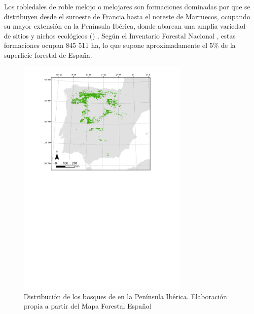 Los robledales de roble melojo o melojares son formaciones dominadas por \Qpw que se distribuyen desde el suroeste de Francia hasta el noreste de Marruecos, ocupando su mayor extensión en la Península Ibérica, donde abarcan una amplia variedad de sitios y nichos ecológicos () \autocites{NietoQuintanoetal2016QuercusPyrenaica, GarciaJimenez20099230Robledales,VilchesdelaSerna2014ComprehensiveStudy,delaSernaetal2016MarcescentQuercus}. Según el Inventario Forestal Nacional \autocite{Villanueva2005TercerInventario}, estas formaciones ocupan 845 511 ha, lo que supone aproximadamente el 5\% de la superficie forestal de España. 

\begin{figure}[h]
	\centering
	\includegraphics[width=0.75\textwidth]{img/metodologia/metodologia-robledal-spain-v2.pdf} \caption{Distribución de los bosques de \Qpy en la Península Ibérica. Elaboración propia a partir del Mapa Forestal Español} \label{fig:metodologia:distroble}
\end{figure}

